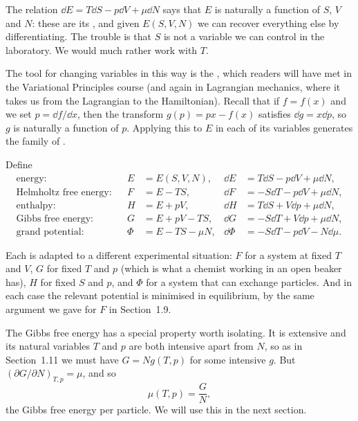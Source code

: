 \documentclass[a4paper]{scrartcl}
\begin{document}
The relation $\dd E = T\dd S - p\dd V + \mu\dd N$ says that $E$ is naturally a function of $S$, $V$ and $N$: these are its , and given $E(S,V,N)$ we can recover everything else by differentiating. The trouble is that $S$ is not a variable we can control in the laboratory. We would much rather work with $T$.

The tool for changing variables in this way is the , which readers will have met in the Variational Principles course (and again in Lagrangian mechanics, where it takes us from the Lagrangian to the Hamiltonian). Recall that if $f = f(x)$ and we set $p = \dd f/\dd x$, then the transform $g(p) = px - f(x)$ satisfies $\dd g = x \dd p$, so $g$ is naturally a function of $p$. Applying this to $E$ in each of its variables generates the family of .

\begin{definition}
	Define
	\begin{align*}
		\text{energy:} && E &= E(S,V,N), & \dd E &= T\dd S - p \dd V + \mu\dd N,\\
		\text{Helmholtz free energy:} && F &= E - TS, & \dd F &= -S\dd T - p\dd V + \mu\dd N,\\
		\text{enthalpy:} && H &= E + pV, & \dd H &= T\dd S + V\dd p + \mu \dd N,\\
		\text{Gibbs free energy:} && G &= E + pV - TS, & \dd G &= -S\dd T + V\dd p + \mu\dd N,\\
		\text{grand potential:} && \Phi &= E - TS - \mu N, & \dd\Phi &= -S\dd T - p\dd V - N\dd \mu.
	\end{align*}
\end{definition}

Each is adapted to a different experimental situation: $F$ for a system at fixed $T$ and $V$, $G$ for fixed $T$ and $p$ (which is what a chemist working in an open beaker has), $H$ for fixed $S$ and $p$, and $\Phi$ for a system that can exchange particles. And in each case the relevant potential is minimised in equilibrium, by the same argument we gave for $F$ in Section~1.9.

The Gibbs free energy has a special property worth isolating. It is extensive and its natural variables $T$ and $p$ are both intensive apart from $N$, so as in Section~1.11 we must have $G = N g(T,p)$ for some intensive $g$. But $(\partial G/\partial N)_{T,p} = \mu$, and so
$$
\mu(T,p) = \frac GN,
$$
the Gibbs free energy per particle. We will use this in the next section.
\end{document}
